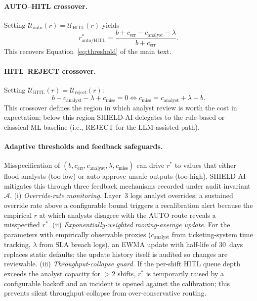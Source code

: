 \documentclass[preprint,12pt,authoryear]{elsarticle}
\begin{document}
\paragraph{AUTO--HITL crossover.}
Setting $\mathcal{U}_{\text{auto}}(r) = \mathcal{U}_{\text{HITL}}(r)$ yields
\begin{equation}
r^*_{\text{auto/HITL}} = \frac{b + c_{\text{err}} - c_{\text{analyst}} - \lambda}{b + c_{\text{err}}}.
\label{eq:thresholdapp1}
\end{equation}
This recovers Equation~\ref{eq:threshold} of the main text.

\paragraph{HITL--REJECT crossover.}
Setting $\mathcal{U}_{\text{HITL}}(r) = \mathcal{U}_{\text{reject}}(r)$:
\begin{equation}
b - c_{\text{analyst}} - \lambda + c_{\text{miss}} = 0 \iff c_{\text{miss}} = c_{\text{analyst}} + \lambda - b.
\end{equation}
This crossover defines the region in which analyst review is worth the cost in expectation; below this region SHIELD-AI delegates to the rule-based or classical-ML baseline (i.e., REJECT for the LLM-assisted path).

\paragraph{Adaptive thresholds and feedback safeguards.}
Misspecification of $(b, c_{\text{err}}, c_{\text{analyst}}, \lambda, c_{\text{miss}})$ can drive $r^*$ to values that either flood analysts (too low) or auto-approve unsafe outputs (too high). SHIELD-AI mitigates this through three feedback mechanisms recorded under audit invariant $\mathcal{A}$. (i) \emph{Override-rate monitoring.} Layer~3 logs analyst overrides; a sustained override rate above a configurable bound triggers a recalibration alert because the empirical $r$ at which analysts disagree with the AUTO route reveals a misspecified $r^*$. (ii) \emph{Exponentially-weighted moving-average update.} For the parameters with empirically observable proxies ($c_{\text{analyst}}$ from ticketing-system time tracking, $\lambda$ from SLA breach logs), an EWMA update with half-life of 30~days replaces static defaults; the update history itself is audited so changes are reviewable. (iii) \emph{Throughput-collapse guard.} If the per-shift HITL queue depth exceeds the analyst capacity for $> 2$ shifts, $r^*$ is temporarily raised by a configurable backoff and an incident is opened against the calibration; this prevents silent throughput collapse from over-conservative routing.
\end{document}
